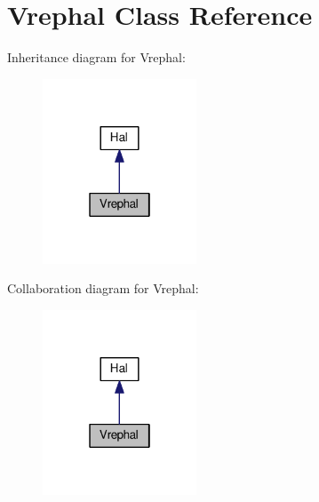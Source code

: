 \hypertarget{class_vrephal}{}\section{Vrephal Class Reference}
\label{class_vrephal}


Inheritance diagram for Vrephal\+:\nopagebreak
\begin{figure}[H]
\begin{center}
\leavevmode
\includegraphics[width=130pt]{class_vrephal__inherit__graph}
\end{center}
\end{figure}


Collaboration diagram for Vrephal\+:\nopagebreak
\begin{figure}[H]
\begin{center}
\leavevmode
\includegraphics[width=130pt]{class_vrephal__coll__graph}
\end{center}
\end{figure}
